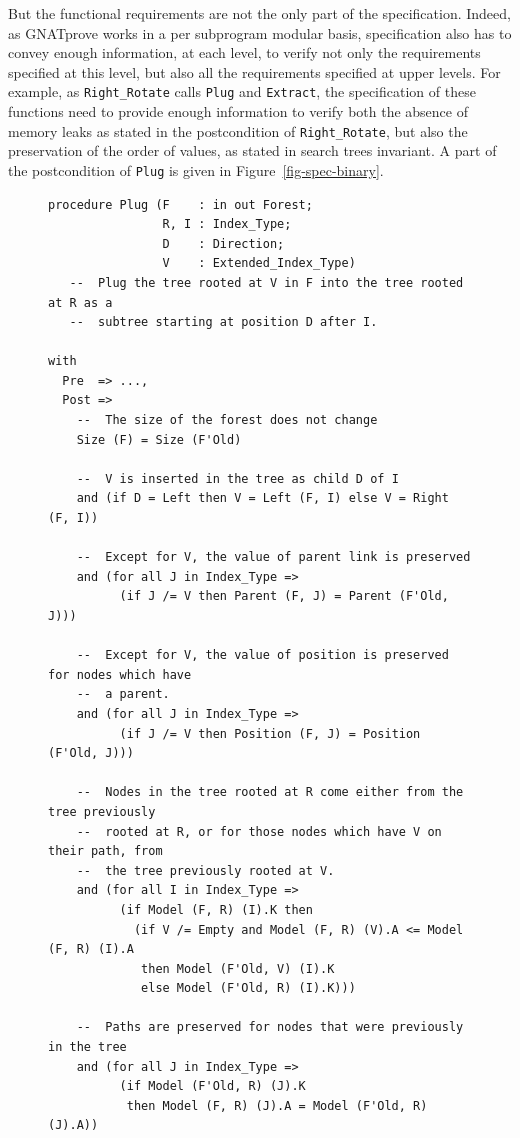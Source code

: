 \documentclass{llncs}
\newcommand{\gnatprove}{GNATprove\xspace}
\begin{document}
But the functional requirements are not the only part of the specification. Indeed, as \gnatprove works in a per
subprogram modular basis, specification also has to convey enough information, at each level, to verify not only the
requirements specified at this level, but also all the requirements specified at upper levels. For example, as
\texttt{Right\_Rotate} calls \texttt{Plug} and \texttt{Extract}, the specification of these functions need to provide
enough information to
verify both the absence of memory leaks as stated in the postcondition of \texttt{Right\_Rotate}, but also the preservation of
the order of values, as stated in search trees invariant. A part of the postcondition of \texttt{Plug} is given in
Figure~\ref{fig-spec-binary}.

\begin{figure}
\begin{small}
\begin{lstlisting}
procedure Plug (F    : in out Forest;
                R, I : Index_Type;
                D    : Direction;
                V    : Extended_Index_Type)
   --  Plug the tree rooted at V in F into the tree rooted at R as a
   --  subtree starting at position D after I.

with
  Pre  => ...,
  Post =>
    --  The size of the forest does not change
    Size (F) = Size (F'Old)

    --  V is inserted in the tree as child D of I
    and (if D = Left then V = Left (F, I) else V = Right (F, I))

    --  Except for V, the value of parent link is preserved
    and (for all J in Index_Type =>
          (if J /= V then Parent (F, J) = Parent (F'Old, J)))

    --  Except for V, the value of position is preserved for nodes which have
    --  a parent.
    and (for all J in Index_Type =>
          (if J /= V then Position (F, J) = Position (F'Old, J)))

    --  Nodes in the tree rooted at R come either from the tree previously
    --  rooted at R, or for those nodes which have V on their path, from
    --  the tree previously rooted at V.
    and (for all I in Index_Type =>
          (if Model (F, R) (I).K then
            (if V /= Empty and Model (F, R) (V).A <= Model (F, R) (I).A
             then Model (F'Old, V) (I).K
             else Model (F'Old, R) (I).K)))

    --  Paths are preserved for nodes that were previously in the tree
    and (for all J in Index_Type =>
          (if Model (F'Old, R) (J).K
           then Model (F, R) (J).A = Model (F'Old, R) (J).A))


\end{lstlisting}
\end{small}
\end{figure}
\end{document}
